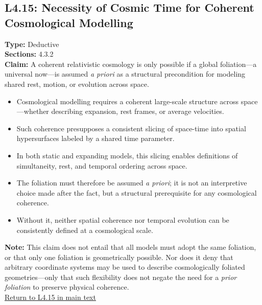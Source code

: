 \documentclass[12pt]{book}
\newcommand{\returnlink}[1]{\hyperref[logic:#1]{Return to #1 in main text}\xspace}
\begin{document}
\subsection*{L4.15: Necessity of Cosmic Time for Coherent Cosmological Modelling}
\label{appendix:L4.15}
\textbf{Type:} Deductive \\
\textbf{Sections:} 4.3.2 \\
\textbf{Claim:} A coherent relativistic cosmology is only possible if a global foliation---a universal now---is assumed \textit{a priori} as a structural precondition for modeling shared rest, motion, or evolution across space.
\begin{itemize}
  \item Cosmological modelling requires a coherent large-scale structure across space---whether describing expansion, rest frames, or average velocities.
  \item Such coherence presupposes a consistent slicing of space-time into spatial hypersurfaces labeled by a shared time parameter.
  \item In both static and expanding models, this slicing enables definitions of simultaneity, rest, and temporal ordering across space.
  \item The foliation must therefore be assumed \textit{a priori}; it is not an interpretive choice made after the fact, but a structural prerequisite for any cosmological coherence.
  \item Without it, neither spatial coherence nor temporal evolution can be consistently defined at a cosmological scale.
\end{itemize}
\textbf{Note:} This claim does not entail that all models must adopt the same foliation, or that only one foliation is geometrically possible. Nor does it deny that arbitrary coordinate systems may be used to describe cosmologically foliated geometries---only that such flexibility does not negate the need for a \textit{prior foliation} to preserve physical coherence. \\
\returnlink{L4.15}
\end{document}
